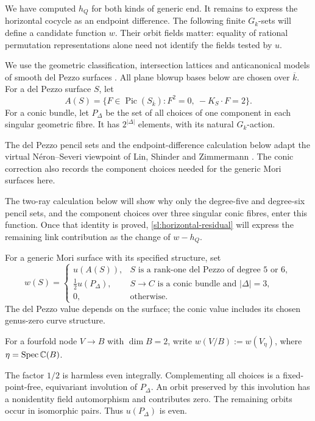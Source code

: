 We have computed $h_Q$ for both kinds of generic end.  It remains to
express the horizontal cocycle as an endpoint difference.  The following
finite $G_k$-sets will define a candidate function $w$.  Their orbit fields
matter: equality of rational permutation representations alone need not
identify the fields tested by $u$.

We use the geometric classification, intersection lattices and
anticanonical models of smooth del Pezzo surfaces
\cite[Sections~3.4 and~6.1]{DolgachevIskovskikh2009}.
All plane blowup bases below are chosen over $\overline k$.
For a del Pezzo surface $S$, let
\[
 A(S)=\{F\in\operatorname{Pic}(S_{\overline k}):
           F^2=0,\ -K_S\cdot F=2\}.
\]
For a conic bundle, let $P_\Delta$ be the set of all choices of one
component in each singular geometric fibre.  It has $2^{|\Delta|}$
elements, with its natural $G_k$-action.

The del Pezzo pencil sets and the endpoint-difference calculation below
adapt the virtual N\'eron--Severi viewpoint of Lin, Shinder and Zimmermann
\cite[Definition~5.2 and Proposition~5.5]{LinShinderZimmermann23}.
The conic correction also records the component choices needed for the
generic Mori surfaces here.

The two-ray calculation below will show why only the
degree-five and degree-six pencil sets, and the component choices
over three singular conic fibres, enter this function.  Once that
identity is proved, \eqref{sl:horizontal-residual} will express the
remaining link contribution as the change of $w-h_Q$.

\begin{definition}\label{sl:w-def}
For a generic Mori surface with its specified structure, set
\[
 w(S)=
 \begin{cases}
 u(A(S)),&S\text{ is a rank-one del Pezzo of degree }5\text{ or }6,\\
 \tfrac12u(P_\Delta),&S\to C\text{ is a conic bundle and }|\Delta|=3,\\
 0,&\text{otherwise}.
 \end{cases}
\]
The del Pezzo value depends on the surface; the conic value includes its
chosen genus-zero curve structure.
\end{definition}

For a fourfold node $V\to B$ with $\dim B=2$, write
$w(V/B):=w(V_\eta)$, where $\eta=\operatorname{Spec}\mathbb C(B)$.

The factor $1/2$ is harmless even integrally.  Complementing all choices
is a fixed-point-free, equivariant involution of $P_\Delta$.  An orbit
preserved by this involution has a nonidentity field automorphism and
contributes zero.  The remaining orbits occur in isomorphic pairs.
Thus $u(P_\Delta)$ is even.

